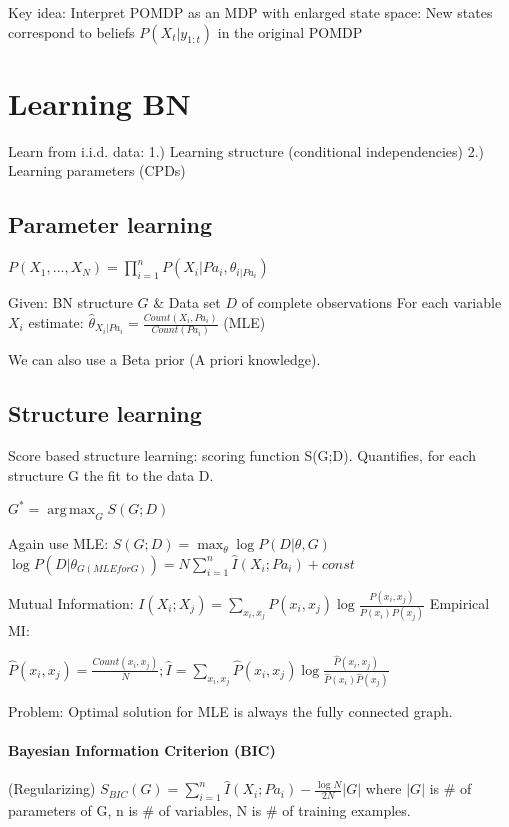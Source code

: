 \documentclass[a4paper, 10pt]{scrartcl}
\DeclareMathOperator*{\argmax}{arg\,max}
\begin{document}
\begin{multicols*}{3}
Key idea: Interpret POMDP as an MDP with enlarged state space: New states correspond to beliefs $P(X_t | y_{1:t})$ in the original POMDP

\section{Learning BN}
Learn from i.i.d. data: 1.) Learning structure (conditional independencies) 2.) Learning parameters (CPDs)

\subsection{Parameter learning}
$P(X_1, ..., X_N) = \prod_{i=1}^{n} P(X_i | Pa_i, {\theta}_{i | Pa_i})$

Given:  BN structure $G$ \& Data set $D$ of complete observations
For each variable $X_i$ estimate: $\hat{\theta}_{X_i | Pa_i} = \frac{Count(X_i , Pa_i)}{Count(Pa_i)}$ (MLE)

We can also use a Beta prior (A priori knowledge).

\subsection{Structure learning}
Score based structure learning: scoring function S(G;D). Quantifies, for each structure G the fit to the data D. 

$G^* = \argmax_G S(G;D)$

Again use MLE: $S(G;D) = \max_\theta \log P(D | \theta, G)$
$\log P(D | \theta_{G (MLE for G)}) = N \sum_{i=1}^{n} \hat{I}(X_i ; Pa_i) + const$

Mutual Information: $I(X_i; X_j) = \sum_{x_i, x_j} P(x_i, x_j) \log \frac{P(x_i, x_j)}{P(x_i) P(x_j)}$
Empirical MI: 

$\hat{P}(x_i, x_j) = \frac{Count(x_i, x_j)}{N}; \hat{I} = \sum_{x_i, x_j} \hat{P}(x_i, x_j) \log \frac{\hat{P}(x_i, x_j)}{\hat{P}(x_i) \hat{P}(x_j)}$

Problem: Optimal solution for MLE is always the fully  connected graph. 

\paragraph{Bayesian Information Criterion (BIC)}
(Regularizing) $S_{BIC}(G) = \sum_{i=1}^{n} \hat{I}(X_i ; Pa_i) - \frac{\log N}{2N} |G|$ where $|G|$ is \# of parameters of G, n is \# of variables, N is \# of training examples.


\end{multicols*}
\end{document}

